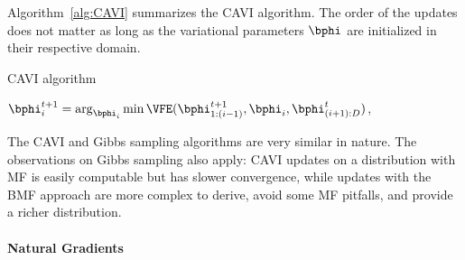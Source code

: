 Algorithm~\ref{alg:CAVI} summarizes the \ac{CAVI} algorithm.
The order of the updates does not matter as long as the variational parameters $\bphi$ are initialized in their respective domain.

\begin{algorithm}
    \caption{\ac{CAVI} algorithm}
    \label{alg:CAVI}
    \begin{algorithmic}
                \State $\bphi_i^{t+1} = \arg_{\bphi_i}\min \VFE(\bphi^{t+1}_{1:(i-1)},\bphi_i, \bphi^t_{(i+1):D})$,
            \EndFor
        \EndWhile
    \end{algorithmic}
\end{algorithm}

The \ac{CAVI} and Gibbs sampling algorithms are very similar in nature.
The observations on Gibbs sampling also apply: \ac{CAVI} updates on a distribution with \ac{MF} is easily computable but has slower convergence, while updates with the \ac{BMF} approach are more complex to derive, avoid some \ac{MF} pitfalls, and provide a richer distribution.

\paragraph{Natural Gradients}

